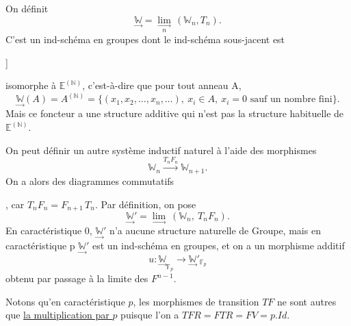 \documentclass[11pt]{article}
\newcommand{\scanpage}[1]{\par\bigskip\noindent{\small\sffamily[scan #1]}\par}
\newcommand{\mspage}[1]{{\small\sffamily[p.\,#1]}}
\newcommand{\hand}[1]{\textcolor{blue}{#1}}
\newcommand{\uline}[1]{\underline{#1}}
\newcommand{\unsure}[1]{[#1?]}
\newenvironment{diagramblock}{\par\begin{center}}{\end{center}\par}
\begin{document}
On définit
\[ \underset{\rightarrow}{\mathbb{W}} = \underset{n}{\underset{\rightarrow}{\lim}}\, (\mathbb{W}_n,T_n). \]
C'est un ind-schéma en groupes dont le ind-schéma sous-jacent est

\mspage{\unsure{5}}

\clearpage
\scanpage{129/6}
isomorphe à  $\mathbb{E}^{(\mathbb{N})}$, c'est-à-dire que pour tout anneau  A,
\[ \underset{\rightarrow}{\mathbb{W}}(A) = A^{(\mathbb{N})} = \{(x_1,x_2,\ldots,x_n,\ldots),\ x_i \in A,\ x_i = 0 \text{ sauf un nombre fini}\}. \]
Mais ce foncteur a une structure additive qui n'est pas la structure
habituelle de $\mathbb{E}^{(\mathbb{N})}$.

On peut définir un autre système inductif naturel à l'aide des
morphismes
\[ \mathbb{W}_n \xrightarrow{T_n F_n} \mathbb{W}_{n+1} . \]
On a alors des diagrammes commutatifs
\begin{diagramblock}
\end{diagramblock} ,
car  $T_nF_n = F_{n+1}\,T_n$.  Par définition, on pose
\[ \underset{\rightarrow}{\mathbb{W}}' = \underset{\rightarrow}{\lim}\ (\mathbb{W}_n,\ T_nF_n). \]
En caractéristique  0, $\underset{\rightarrow}{\mathbb{W}}'$  n'a aucune structure naturelle de Groupe,
mais en caractéristique p $\underset{\rightarrow}{\mathbb{W}}'$ est un ind-schéma en groupes, et on a un
morphisme additif
\[ u\colon \underset{\rightarrow}{\mathbb{W}}_{\mathbb{F}_p} \to \underset{\rightarrow}{\mathbb{W}}'_{\mathbb{F}_p} \]
obtenu par passage à la limite des  $F^{n-1}$.

\mspage{\hand{6}}

\clearpage
\scanpage{129/7}
Notons qu'en caractéristique $p$, les morphismes de transition $TF$ ne
sont autres que \uline{la multiplication par $p$} puisque l'on a $TFR = FTR = FV = p.Id$.
\end{document}
